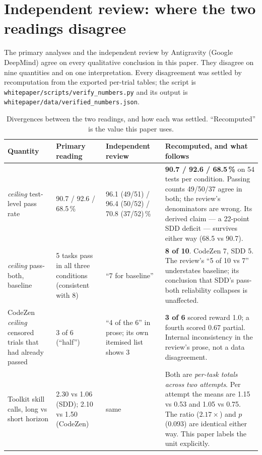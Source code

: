\documentclass[11pt,a4paper]{article}
\newcommand{\code}[1]{\texttt{\small #1}}
\begin{document}
\section{Independent review: where the two readings disagree}
\label{sec:divergence}

The primary analyses and the independent review by Antigravity (Google DeepMind) agree on
every qualitative conclusion in this paper. They disagree on nine quantities and on one
interpretation. Every disagreement was settled by recomputation from the exported per-trial
tables; the script is \code{whitepaper/scripts/}\allowbreak\code{verify\_numbers.py} and its output is
\code{whitepaper/data/}\allowbreak\code{verified\_numbers.json}.

\begin{table}[htbp]
\centering
\caption{Divergences between the two readings, and how each was settled. ``Recomputed'' is
the value this paper uses.}
\label{tab:divergence}
\footnotesize
\begin{tabular}{@{}p{3.5cm}p{3.3cm}p{3.3cm}p{4.6cm}@{}}
\toprule
Quantity & Primary reading & Independent review & Recomputed, and what follows \\
\midrule
\emph{ceiling} test-level pass rate &
90.7 / 92.6 / 68.5\,\% &
96.1 (49/51) / 96.4 (50/52) / 70.8 (37/52)\,\% &
\textbf{90.7 / 92.6 / 68.5\,\%} on 54 tests per condition. Passing counts 49/50/37 agree in
both; the review's denominators are wrong. Its derived claim --- a 22-point SDD deficit ---
survives either way (68.5 vs 90.7). \\
\addlinespace
\emph{ceiling} pass-both, baseline &
5 tasks pass in all three conditions (consistent with 8) &
``7 for baseline'' &
\textbf{8 of 10}. CodeZen 7, SDD 5. The review's ``5 of 10 vs 7'' understates baseline;
its conclusion that SDD's pass-both reliability collapses is unaffected. \\
\addlinespace
CodeZen \emph{ceiling} censored trials that had already passed &
3 of 6 (``half'') &
``4 of the 6'' in prose; its own itemised list shows 3 &
\textbf{3 of 6} scored reward 1.0; a fourth scored 0.67 partial. Internal inconsistency in
the review's prose, not a data disagreement. \\
\addlinespace
Toolkit skill calls, long vs short horizon &
2.30 vs 1.06 (SDD); 2.10 vs 1.50 (CodeZen) &
same &
Both are \emph{per-task totals across two attempts}. Per attempt the means are 1.15 vs 0.53
and 1.05 vs 0.75. The ratio ($2.17\times$) and $p$ (0.093) are identical either way. This
paper labels the unit explicitly. \\

\end{tabular}
\end{table}
\end{document}
